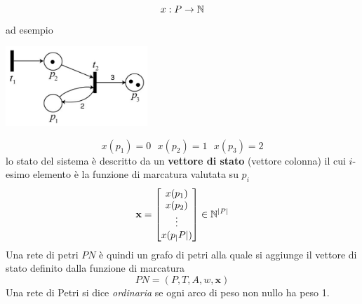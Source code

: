 \documentclass[10pt, letterpaper]{report}
\begin{document}
$$ x:P\rightarrow {\mathbb N}$$
ad esempio
\begin{center}
    \includegraphics[width=0.4\textwidth]{images/petri2.png}
\end{center}
$$ x(p_1)=0 \ \ \ x(p_2)=1 \ \ \ x(p_3)=2$$
lo stato del sistema è descritto da un \textbf{vettore di stato} (vettore colonna) il cui $i$-esimo elemento è la funzione di marcatura valutata su $p_i$ 
$$ \mathbf x = \begin{bmatrix}
    x(p_1)\\ 
    x(p_2)\\ 
    \vdots \\ 
    x(p_|P|)
\end{bmatrix}\in {\mathbb N}^{|P|}$$
Una rete di petri $PN$ è quindi un grafo di petri alla quale si aggiunge il vettore di stato definito dalla funzione di marcatura 
$$ PN=(P,T,A,w,\mathbf x)$$
Una rete di Petri si dice \textit{ordinaria} se ogni arco di peso non nullo ha peso 1.
\end{document}
